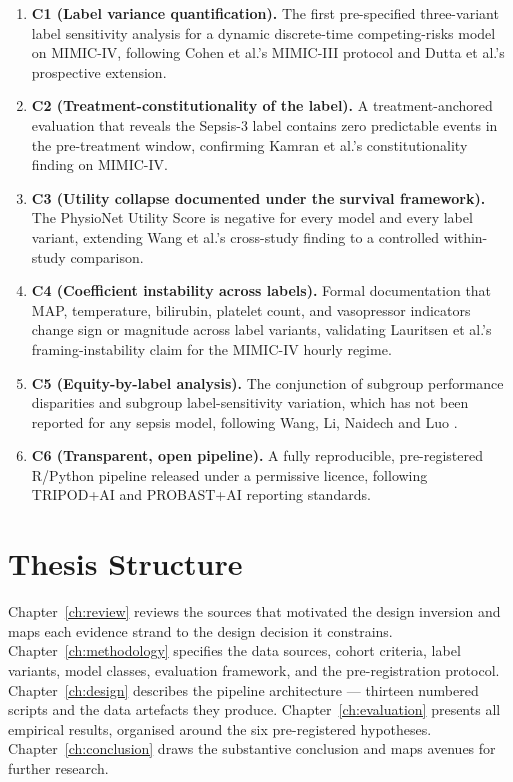 \begin{enumerate}
  \item \textbf{C1 (Label variance quantification).} The first pre-specified
  three-variant label sensitivity analysis for a dynamic discrete-time
  competing-risks model on MIMIC-IV, following Cohen et al.'s \parencite{cohen2024subtle}
  MIMIC-III protocol and Dutta et al.'s \parencite{dutta2026performance}
  prospective extension.
  \item \textbf{C2 (Treatment-constitutionality of the label).} A treatment-anchored
  evaluation that reveals the Sepsis-3 label contains zero predictable events in
  the pre-treatment window, confirming Kamran et al.'s \parencite{kamran2024evaluation}
  constitutionality finding on MIMIC-IV.
  \item \textbf{C3 (Utility collapse documented under the survival framework).}
  The PhysioNet Utility Score is negative for every model and every label
  variant, extending Wang et al.'s \parencite{wang2025srpm} cross-study finding
  to a controlled within-study comparison.
  \item \textbf{C4 (Coefficient instability across labels).} Formal documentation
  that MAP, temperature, bilirubin, platelet count, and vasopressor indicators
  change sign or magnitude across label variants, validating Lauritsen et al.'s
  \parencite{lauritsen2021framing} framing-instability claim for the MIMIC-IV
  hourly regime.
  \item \textbf{C5 (Equity-by-label analysis).} The conjunction of subgroup
  performance disparities and subgroup label-sensitivity variation, which has
  not been reported for any sepsis model, following Wang, Li, Naidech and Luo
  \parencite{wang2022equity}.
  \item \textbf{C6 (Transparent, open pipeline).} A fully reproducible,
  pre-registered R/Python pipeline released under a permissive licence, following
  TRIPOD+AI \parencite{collins2024tripodai} and PROBAST+AI
  \parencite{moons2025probastai} reporting standards.
\end{enumerate}

\section{Thesis Structure}

Chapter~\ref{ch:review} reviews the sources that motivated the design inversion
and maps each evidence strand to the design decision it constrains.
Chapter~\ref{ch:methodology} specifies the data sources, cohort criteria, label
variants, model classes, evaluation framework, and the pre-registration protocol.
Chapter~\ref{ch:design} describes the pipeline architecture --- thirteen numbered
scripts and the data artefacts they produce.
Chapter~\ref{ch:evaluation} presents all empirical results, organised around the
six pre-registered hypotheses.
Chapter~\ref{ch:conclusion} draws the substantive conclusion and maps avenues for
further research.
